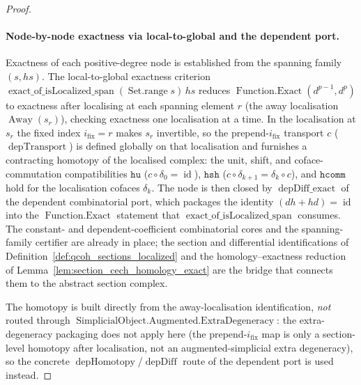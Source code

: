 \begin{proof}
  \paragraph{Node-by-node exactness via local-to-global and the dependent port.}
  Exactness of each positive-degree node is established from the spanning family
  \((s, hs)\). The local-to-global exactness criterion
  \(\operatorname{exact\_of\_isLocalized\_span}(\operatorname{Set.range} s)\, hs\)
  reduces \(\operatorname{Function.Exact}(d^{p-1}, d^{p})\) to exactness after
  localising at each spanning element \(r\) (the away localisation
  \(\operatorname{Away}(s_r)\)), checking exactness one localisation at a time. In the
  localisation at \(s_r\) the fixed index \(i_{\mathrm{fix}} = r\) makes \(s_r\)
  invertible, so the prepend-\(i_{\mathrm{fix}}\) transport \(c\)
  (\(\operatorname{depTransport}\)) is defined globally on that localisation and
  furnishes a contracting homotopy of the localised complex: the unit, shift, and
  coface-commutation compatibilities \(\mathtt{hu}\) (\(c \circ \delta_0 =
  \operatorname{id}\)), \(\mathtt{hsh}\) (\(c \circ \delta_{k+1} = \delta_k \circ c\)),
  and \(\mathtt{hcomm}\) hold for the localisation cofaces \(\delta_k\). The node is
  then closed by \(\operatorname{depDiff\_exact}\) of the dependent combinatorial port,
  which packages the identity \((dh + hd) = \operatorname{id}\) into the
  \(\operatorname{Function.Exact}\) statement that
  \(\operatorname{exact\_of\_isLocalized\_span}\) consumes. The constant- and
  dependent-coefficient combinatorial cores and the spanning-family certifier are
  already in place; the section and differential identifications of
  Definition~\ref{def:qcoh_sections_localized} and the homology--exactness reduction of
  Lemma~\ref{lem:section_cech_homology_exact} are the bridge that connects them to the
  abstract section complex.

  The homotopy is built directly from the away-localisation identification, \emph{not}
  routed through \(\operatorname{SimplicialObject.Augmented.ExtraDegeneracy}\): the
  extra-degeneracy packaging does not apply here (the prepend-\(i_{\mathrm{fix}}\) map
  is only a section-level homotopy after localisation, not an augmented-simplicial extra
  degeneracy), so the concrete
  \(\operatorname{depHomotopy}\)/\(\operatorname{depDiff}\) route of the dependent port
  is used instead.
\end{proof}



